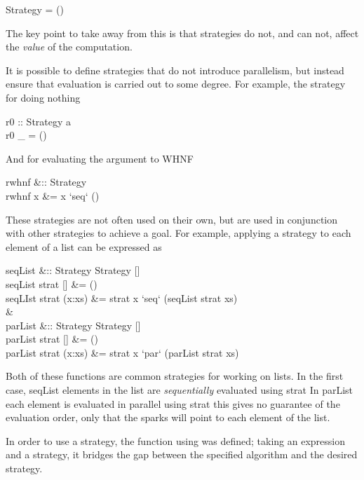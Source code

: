 \begin{haskell}
 Strategy \hasalpha = \hasalpha \to ()
\end{haskell}

The key point to take away from this is that strategies do not, and can not,
affect the \emph{value} of the computation.

It is possible to define strategies that do not introduce parallelism, but
instead ensure that evaluation is carried out to some degree.  For example, the
strategy for doing nothing

\begin{haskell}
r0 :: Strategy a\\
r0 \_ = ()
\end{haskell}

And for evaluating the argument to WHNF

\begin{haskell}
rwhnf   &:: Strategy \hasalpha\\
rwhnf x &= x `seq` ()
\end{haskell}

These strategies are not often used on their own, but are used in conjunction
with other strategies to achieve a goal. For example, applying a strategy to
each element of a list can be expressed as

\begin{haskell}
seqList &:: Strategy \hasalpha \to Strategy [\hasalpha]\\
seqList strat [] &= ()\\
seqLIst strat (x:xs) &= strat x `seq` (seqList strat xs)\\
\quad&\quad \\
parList &:: Strategy \hasalpha \to Strategy [\hasalpha] \\
parList strat [] &= () \\
parList strat (x:xs) &= strat x `par` (parList strat xs)
\end{haskell}

Both of these functions are common strategies for working on lists. In the first
case, \<seqList\> elements in the list are \emph{sequentially} evaluated
using \<strat\> In \<parList\> each element is evaluated in parallel
using \<strat\> this gives no guarantee of the evaluation order, only that
the sparks will point to each element of the list.

In order to use a strategy, the function \<using\> was defined; taking an
expression and a strategy, it bridges the gap between the specified algorithm
and the desired strategy.

